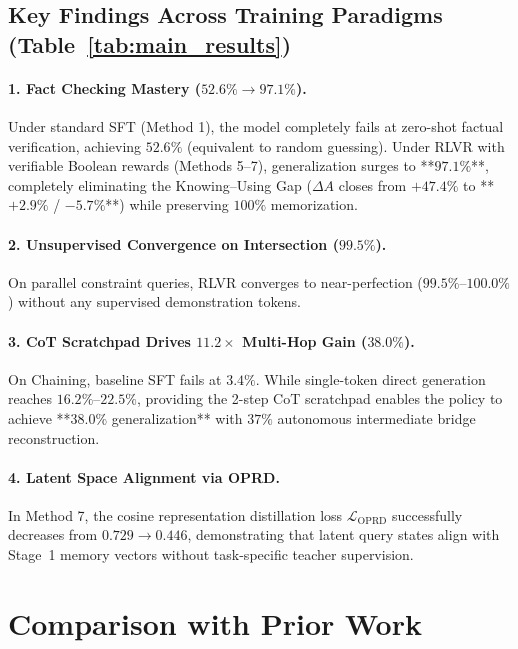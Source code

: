 \documentclass[11pt]{article}
\newcommand{\Loprd}{\mathcal{L}_{\text{OPRD}}}
\theoremstyle{definition}
\begin{document}
\subsection{Key Findings Across Training Paradigms (Table~\ref{tab:main_results})}

\paragraph{1. Fact Checking Mastery ($\mathbf{52.6\% \to 97.1\%}$).}
Under standard SFT (Method 1), the model completely fails at zero-shot factual verification, achieving $52.6\%$ (equivalent to random guessing). Under RLVR with verifiable Boolean rewards (Methods 5--7), generalization surges to **$97.1\%$**, completely eliminating the Knowing--Using Gap ($\Delta A$ closes from $+47.4\%$ to **$+2.9\%$ / $-5.7\%$**) while preserving $100\%$ memorization.

\paragraph{2. Unsupervised Convergence on Intersection ($\mathbf{99.5\%}$).}
On parallel constraint queries, RLVR converges to near-perfection ($99.5\%$--$100.0\%$) without any supervised demonstration tokens.

\paragraph{3. CoT Scratchpad Drives $\mathbf{11.2\times}$ Multi-Hop Gain ($\mathbf{38.0\%}$).}
On Chaining, baseline SFT fails at $3.4\%$. While single-token direct generation reaches $16.2\%$--$22.5\%$, providing the 2-step CoT scratchpad enables the policy to achieve **$38.0\%$ generalization** with $37\%$ autonomous intermediate bridge reconstruction.

\paragraph{4. Latent Space Alignment via OPRD.}
In Method 7, the cosine representation distillation loss $\Loprd$ successfully decreases from $0.729 \to 0.446$, demonstrating that latent query states align with Stage~1 memory vectors without task-specific teacher supervision.

\section{Comparison with Prior Work}\label{sec:related}
\end{document}
